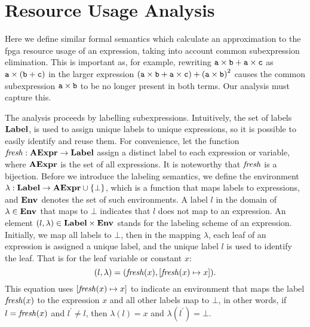 \section{Resource Usage Analysis}
\label{so:sec:resource}

Here we define similar formal semantics which calculate an approximation to
the \gls{fpga} resource usage of an expression, taking into account common
subexpression elimination. This is important as, for example, rewriting $\texttt{a}
\times \texttt{b} + \texttt{a} \times \texttt{c}$ as $\texttt{a} \times (\texttt{b} + \texttt{c})$ in the
larger expression $(\texttt{a} \times \texttt{b} + \texttt{a} \times \texttt{c}) + {(\texttt{a} \times
\texttt{b})}^2$ causes the common subexpression $\texttt{a} \times \texttt{b}$ to be no longer
present in both terms. Our analysis must capture this.

The analysis proceeds by labelling subexpressions. Intuitively, the
set of labels $\mathbf{Label}$, is used to assign unique labels to unique
expressions, so it is possible to easily identify and reuse them. For
convenience, let the function $\operatorname{\mathit{fresh}}: \mathbf{AExpr}\to\mathbf{Label}$ assign a
distinct label to each expression or variable, where $\mathbf{AExpr}$ is the set
of all expressions.  It is noteworthy that $\operatorname{\mathit{fresh}}$ is a bijection. Before
we introduce the labeling semantics, we define the environment $\lambda:
\mathbf{Label}\to\mathbf{AExpr}\cup\{\bot\}$, which is a function that maps labels to
expressions, and $\mathbf{Env}_{}$ denotes the set of such environments. A label $l$ in
the domain of $\lambda\in\mathbf{Env}_{}$ that maps to $\bot$ indicates that $l$ does
not map to an expression. An element $(l, \lambda)\in\mathbf{Label}\times\mathbf{Env}_{}$
stands for the labeling scheme of an expression. Initially, we map all labels
to $\bot$, then in the mapping $\lambda$, each leaf of an expression is
assigned a unique label, and the unique label $l$ is used to identify the leaf.
That is for the leaf variable or constant $x$:
\begin{equation}
    (l, \lambda) = (\operatorname{\mathit{fresh}}(x), [\operatorname{\mathit{fresh}}(x)\mapsto{x}]).
\end{equation}
This equation uses $[\operatorname{\mathit{fresh}}(x)\mapsto{x}]$ to indicate an environment that
maps the label $\operatorname{\mathit{fresh}}(x)$ to the expression $x$ and all other labels map
to $\bot$, in other words, if $l = \operatorname{\mathit{fresh}}(x)$ and $l^\prime \neq l$, then
$\lambda(l) = x$ and $\lambda(l^\prime) = \bot$.

